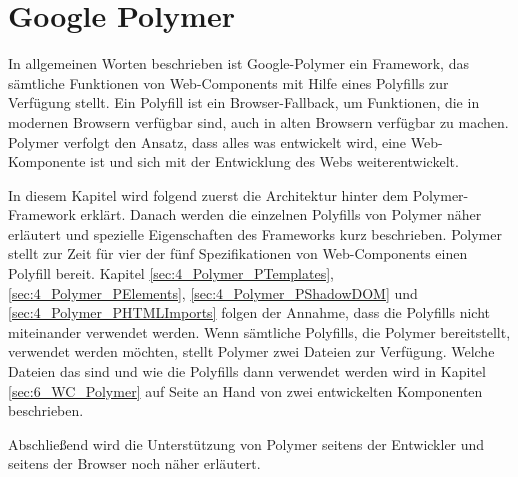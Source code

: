 \section{Google Polymer}
\label{sec:4_Polymer}

In allgemeinen Worten beschrieben ist Google-Polymer ein Framework, das sämtliche Funktionen von Web-Components mit Hilfe eines Polyfills zur Verfügung stellt. Ein Polyfill ist ein Browser-Fallback, um Funktionen, die in modernen Browsern verfügbar sind, auch in alten Browsern verfügbar zu machen. Polymer verfolgt den Ansatz, dass alles was entwickelt wird, eine Web-Komponente ist und sich mit der Entwicklung des Webs weiterentwickelt.

In diesem Kapitel wird folgend zuerst die Architektur hinter dem Polymer-Framework erklärt. Danach werden die einzelnen Polyfills von Polymer näher erläutert und spezielle Eigenschaften des Frameworks kurz beschrieben. Polymer stellt zur Zeit für vier der fünf Spezifikationen von Web-Components einen Polyfill bereit. Kapitel \ref{sec:4_Polymer_PTemplates}, \ref{sec:4_Polymer_PElements}, \ref{sec:4_Polymer_PShadowDOM} und \ref{sec:4_Polymer_PHTMLImports} folgen der Annahme, dass die Polyfills nicht miteinander verwendet werden. Wenn sämtliche Polyfills, die Polymer bereitstellt, verwendet werden möchten, stellt Polymer zwei Dateien zur Verfügung. Welche Dateien das sind und wie die Polyfills dann verwendet werden wird in Kapitel \ref{sec:6_WC_Polymer} auf Seite \pageref{sec:6_WC_Polymer} an Hand von zwei entwickelten Komponenten beschrieben.

Abschließend wird die Unterstützung von Polymer seitens der Entwickler und seitens der Browser noch näher erläutert.








